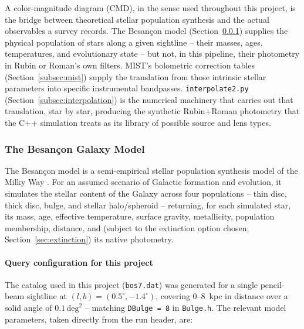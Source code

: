 \documentclass[english,10pt,a4paper]{article}
\begin{document}
	A color-magnitude diagram (CMD), in the sense used throughout this project, is the bridge between theoretical stellar population synthesis and the actual observables a survey records. The Besan\c{c}on model (Section~\ref{subsec:besancon}) supplies the physical population of stars along a given sightline -- their masses, ages, temperatures, and evolutionary state -- but not, in this pipeline, their photometry in Rubin or Roman's own filters. MIST's bolometric correction tables (Section~\ref{subsec:mist}) supply the translation from those intrinsic stellar parameters into specific instrumental bandpasses. \texttt{interpolate2.py} (Section~\ref{subsec:interpolation}) is the numerical machinery that carries out that translation, star by star, producing the synthetic Rubin+Roman photometry that the C++ simulation treats as its library of possible source and lens types.
	
	\subsubsection{The Besan\c{c}on Galaxy Model}
	\label{subsec:besancon}
	
	The Besan\c{c}on model is a semi-empirical stellar population synthesis model of the Milky Way \cite{Robin2003Besancon}. For an assumed scenario of Galactic formation and evolution, it simulates the stellar content of the Galaxy across four populations -- thin disc, thick disc, bulge, and stellar halo/spheroid -- returning, for each simulated star, its mass, age, effective temperature, surface gravity, metallicity, population membership, distance, and (subject to the extinction option chosen; Section~\ref{sec:extinction}) its native photometry.
	
	\paragraph{Query configuration for this project}
	
	The catalog used in this project (\texttt{bos7.dat}) was generated for a single pencil-beam sightline at $(l,b)=(0.5^{\circ},-1.4^{\circ})$, covering $0$--$8$~kpc in distance over a solid angle of $0.1\,\mathrm{deg}^2$ -- matching \texttt{DBulge = 8} in \texttt{Bulge.h}. The relevant model parameters, taken directly from the run header, are:
	
\end{document}
